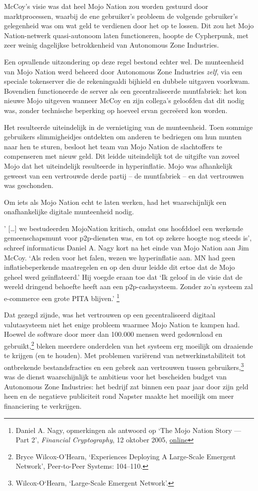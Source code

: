 \documentclass[smalldemyvopaper,11pt,twoside,onecolumn,openright,extrafontsizes,hidelinks]{memoir}
\begin{document}
McCoy's visie was dat heel Mojo Nation zou worden gestuurd door
marktprocessen, waarbij de ene gebruiker's probleem de volgende
gebruiker's gelegenheid was om wat geld te verdienen door het op te
lossen. Dit zou het Mojo Nation-netwerk quasi-autonoom laten
functioneren, hoopte de Cypherpunk, met zeer weinig dagelijkse
betrokkenheid van Autonomous Zone Industries.

Een opvallende uitzondering op deze regel bestond echter wel. De
munteenheid van Mojo Nation werd beheerd door Autonomous Zone Industries
\emph{zelf}, via een speciale tokenserver die de rekeningsaldi bijhield
en dubbele uitgaven voorkwam. Bovendien functioneerde de server als een
gecentraliseerde muntfabriek: het kon nieuwe Mojo uitgeven wanneer McCoy
en zijn collega's geloofden dat dit nodig was, zonder technische
beperking op hoeveel ervan gecreëerd kon worden.

Het resulteerde uiteindelijk in de vernietiging van de munteenheid. Toen
sommige gebruikers slimmigheidjes ontdekten om anderen te bedriegen om
hun munten naar hen te sturen, besloot het team van Mojo Nation de
slachtoffers te compenseren met nieuw geld. Dit leidde uiteindelijk tot
de uitgifte van zoveel Mojo dat het uiteindelijk resulteerde in
hyperinflatie. Mojo was afhankelijk geweest van een vertrouwde derde
partij -- de muntfabriek -- en dat vertrouwen was geschonden.

Om iets als Mojo Nation echt te laten werken, had het waarschijnlijk een
onafhankelijke digitale munteenheid nodig.

' {[}\ldots{]} we bestudeerden MojoNation kritisch, omdat ons hoofddoel
een werkende gemeenschapsmunt voor p2p-diensten was, en tot op zekere
hoogte nog steeds is', schreef informaticus Daniel A. Nagy kort na het
einde van Mojo Nation aan Jim McCoy. `Als reden voor het falen, wezen we
hyperinflatie aan. MN had geen inflatiebeperkende maatregelen en op den
duur leidde dit ertoe dat de Mojo geheel werd geïnflateerd.' Hij voegde
eraan toe dat `Ik geloof in de visie dat de wereld dringend behoefte
heeft aan een p2p-cashsysteem. Zonder zo'n systeem zal e-commerce een
grote PITA blijven.' \footnote{Daniel A. Nagy, opmerkingen als antwoord
  op `The Mojo Nation Story --- Part 2', \emph{Financial Cryptography},
  12 oktober 2005,
  \href{https://www.financialcryptography.com/mt/archives/000572.html}{online}}

Dat gezegd zijnde, was het vertrouwen op een gecentraliseerd digitaal
valutasysteem niet het enige probleem waarmee Mojo Nation te kampen had.
Hoewel de software door meer dan 100.000 mensen werd gedownload en
gebruikt,\footnote{Bryce Wilcox-O'Hearn, `Experiences Deploying A
  Large-Scale Emergent Network', Peer-to-Peer Systems: 104--110.} bleken
meerdere onderdelen van het systeem erg moeilijk om draaiende te krijgen
(en te houden). Met problemen variërend van netwerkinstabiliteit tot
ontbrekende bestandsfracties en een gebrek aan vertrouwen tussen
gebruikers,\footnote{Wilcox-O`Hearn, `Large-Scale Emergent Network'.}
was de dienst waarschijnlijk te ambitieus voor het bescheiden budget van
Autonomous Zone Industries: het bedrijf zat binnen een paar jaar door
zijn geld heen en de negatieve publiciteit rond Napster maakte het
moeilijk om meer financiering te verkrijgen.
\end{document}
